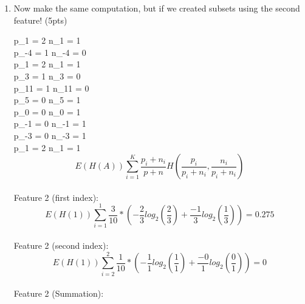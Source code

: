\documentclass[12pt]{article}
\begin{document}
\begin{enumerate}
\begin{enumerate}
	
	
	
	\item Now make the same computation, but if we created subsets using the second feature! (5pts)
	
	p_{1} = 2 \hspace{1cm}      	n_{1} = 1\\ 
	p_{-4} = 1 \hspace{1cm}      	n_{-4} = 0\\ 
	p_{1} = 2 \hspace{1cm}      	n_{1} = 1 \\ 
	p_{3} = 1 \hspace{1cm}      	n_{3} = 0\\ 
	p_{11} = 1 \hspace{1cm}      	n_{11} = 0\\ 
	p_{5} = 0 \hspace{1cm}      	n_{5} = 1\\ 
	p_{0} = 0 \hspace{1cm}      	n_{0} = 1\\ 
	p_{-1} = 0 \hspace{1cm}      	n_{-1} = 1\\ 
	p_{-3} = 0 \hspace{1cm}      	n_{-3} = 1\\ 
	p_{1} = 2 \hspace{1cm}      	n_{1} = 1\\ 
	

	$$	E(H(A)) \sum_{i=1}^{K} \frac{p_{i}+n_{i}}{p + n} H \left (\frac{p_{i}}{p_{i}+n_{i}} , \frac{n_{i}}{p_{i}+n_{i}}\right)$$ \\
	
	Feature 2 (first index): \\
	
	$$	E(H(1)) \sum_{i=1}^{1} \frac{3}{10} * \left (-\frac{2}{3}log_{2} \left(\frac{2}{3}\right) + \frac{-1}{3}log_{2}\left(\frac{1}{3}\right)\right) = 0.275 $$ \\
	
	
	Feature 2 (second index): \\
	
	$$	E(H(1)) \sum_{i=2}^{2} \frac{1}{10} * \left (-\frac{1}{1}log_{2} \left(\frac{1}{1}\right) + \frac{-0}{1}log_{2}\left(\frac{0}{1}\right)\right) = 0 $$ \\
	
	Feature 2 (Summation): \\
	

\end{enumerate}
\end{enumerate}
\end{document}
